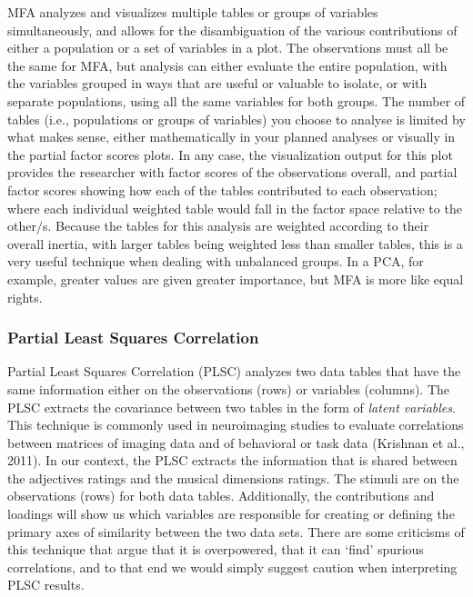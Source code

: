 \documentclass[
  english,
  man,floatsintext]{apa6}
\begin{document}
MFA analyzes and visualizes multiple tables or groups of variables simultaneously, and allows for the disambiguation of the various contributions of either a population or a set of variables in a plot. The observations must all be the same for MFA, but analysis can either evaluate the entire population, with the variables grouped in ways that are useful or valuable to isolate, or with separate populations, using all the same variables for both groups. The number of tables (i.e., populations or groups of variables) you choose to analyse is limited by what makes sense, either mathematically in your planned analyses or visually in the partial factor scores plots. In any case, the visualization output for this plot provides the researcher with factor scores of the observations overall, and partial factor scores showing how each of the tables contributed to each observation; where each individual weighted table would fall in the factor space relative to the other/s. Because the tables for this analysis are weighted according to their overall inertia, with larger tables being weighted less than smaller tables, this is a very useful technique when dealing with unbalanced groups. In a PCA, for example, greater values are given greater importance, but MFA is more like equal rights.

\hypertarget{partial-least-squares-correlation}{%
\subsubsection{Partial Least Squares Correlation}\label{partial-least-squares-correlation}}

Partial Least Squares Correlation (PLSC) analyzes two data tables that have the same information either on the observations (rows) or variables (columns). The PLSC extracts the covariance between two tables in the form of \emph{latent variables}. This technique is commonly used in neuroimaging studies to evaluate correlations between matrices of imaging data and of behavioral or task data (Krishnan et al., 2011). In our context, the PLSC extracts the information that is shared between the adjectives ratings and the musical dimensions ratings. The stimuli are on the observations (rows) for both data tables. Additionally, the contributions and loadings will show us which variables are responsible for creating or defining the primary axes of similarity between the two data sets. There are some criticisms of this technique that argue that it is overpowered, that it can `find' spurious correlations, and to that end we would simply suggest caution when interpreting PLSC results.
\end{document}
